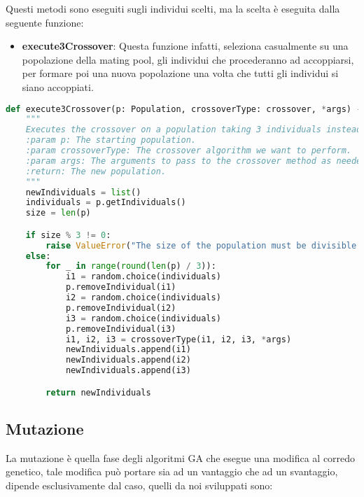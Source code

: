 \documentclass{article}
\begin{document}
\pagebreak




Questi metodi sono eseguiti sugli individui scelti, ma la scelta è eseguita dalla seguente funzione:

\begin{itemize}
\item\textbf{execute3Crossover}: Questa funzione infatti, seleziona casualmente su una popolazione della mating pool, gli individui che procederanno ad accoppiarsi, per formare poi una nuova popolazione una volta che tutti gli individui si siano accoppiati.
\end{itemize}

\begin{lstlisting}[language=Python, breaklines, no caption]
def execute3Crossover(p: Population, crossoverType: crossover, *args) -> list[Individual]:
    """
    Executes the crossover on a population taking 3 individuals instead of 2.
    :param p: The starting population.
    :param crossoverType: The crossover algorithm we want to perform.
    :param args: The arguments to pass to the crossover method as needed.
    :return: The new population.
    """
    newIndividuals = list()
    individuals = p.getIndividuals()
    size = len(p)

    if size % 3 != 0:
        raise ValueError("The size of the population must be divisible by 3!")
    else:
        for _ in range(round(len(p) / 3)):
            i1 = random.choice(individuals)
            p.removeIndividual(i1)
            i2 = random.choice(individuals)
            p.removeIndividual(i2)
            i3 = random.choice(individuals)
            p.removeIndividual(i3)
            i1, i2, i3 = crossoverType(i1, i2, i3, *args)
            newIndividuals.append(i1)
            newIndividuals.append(i2)
            newIndividuals.append(i3)

        return newIndividuals
\end{lstlisting}



\pagebreak

\subsection{Mutazione}

La mutazione è quella fase degli algoritmi GA che esegue una modifica al corredo genetico, tale modifica può portare sia ad un vantaggio che ad un svantaggio, dipende esclusivamente dal caso, quelli da noi sviluppati sono:
\end{document}
